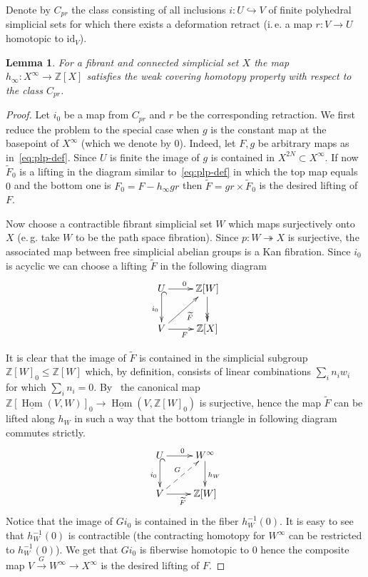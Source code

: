 \documentclass[oneside, 10pt]{amsart}
\theoremstyle{plain}
\numberwithin{equation}{section}
\newtheorem{lemma}{Lemma}
\numberwithin{lemma}{section}
\theoremstyle{remark}
\theoremstyle{definition}
\DeclareMathOperator{\Hom}{Hom}
\newcommand{\ZZ}{\mathbb{Z}}
\begin{document}
Denote by $C_{pr}$ the class consisting of all inclusions $i\colon U\hookrightarrow V$ of finite polyhedral simplicial sets 
 for which there exists a deformation retract (i.\,e. a map $r\colon V\to U$ homotopic to $\mathrm{id}_V$).
\begin{lemma} \label{lm:dhlp} For a fibrant and connected simplicial set $X$ the map $h_\infty \colon X^\infty \to \ZZ[X]$ satisfies the weak covering homotopy property with respect to the class $C_{pr}$.
\end{lemma}
\begin{proof}
 Let $i_0$ be a map from $C_{pr}$ and $r$ be the corresponding retraction.
 We first reduce the problem to the special case when $g$ is the constant map at the basepoint of $X^\infty$ (which we denote by $0$).
 Indeed, let $F, g$ be arbitrary maps as in~\eqref{eq:plp-def}.
 Since $U$ is finite the image of $g$ is contained in $X^{2N} \subset X^\infty$.
 If now $\widetilde{F}_0$ is a lifting in the diagram similar to~\eqref{eq:plp-def} in which the top map equals $0$ and the bottom one is $F_0 = F - h_\infty gr$
  then $\widetilde{F} = gr \times \widetilde{F}_0$ is the desired lifting of $F$.
  
 Now choose a contractible fibrant simplicial set $W$ which maps surjectively onto $X$ (e.\,g. take $W$ to be the path space fibration).
 Since $p \colon W \twoheadrightarrow X$ is surjective, the associated map between free simplicial abelian groups is a Kan fibration. %
 Since $i_0$ is acyclic we can choose a lifting $\widetilde{F}$ in the following diagram
\begin{equation} \nonumber \xymatrix{ 
U \ar[r]^{0}  \ar@{^{(}->}_{i_0}[d] & \ZZ[W] \ar@{->>}[d]  \\
V \ar[r]_{F} \ar[ru]_{\widetilde{F}} & \ZZ[X]}
\end{equation}

 It is clear that the image of $\widetilde{F}$ is contained in the simplicial subgroup $\ZZ[W]_0 \leq \ZZ[W]$ which, by definition, consists of linear combinations $\sum_i n_i w_i$ for which $\sum_i n_i = 0$.
 By~\cite[Lemma~9.1]{Po17} the canonical map $\ZZ[\underline{\Hom}(V, W)]_0 \to \underline{\Hom}(V, \ZZ[W]_0)$ is surjective, hence
  the map $\widetilde{F}$ can be lifted along $h_W$ in such a way that the bottom triangle in following diagram commutes strictly.
\begin{equation} \nonumber \label{eq:W-lift} \xymatrix{ 
U \ar[r]^{0}  \ar@{^{(}->}_{i_0}[d]                               & W^\infty \ar[d]^{h_W}  \\
V \ar[r]_{\widetilde{F}} \ar@{-->}[ru]^{G} & \ZZ[W]}
\end{equation}
 Notice that the image of $Gi_0$ is contained in the fiber $h_W^{-1}(0)$.
 It is easy to see that $h_W^{-1}(0)$ is contractible (the contracting homotopy for $W^\infty$ can be restricted to $h_W^{-1}(0)$).
 We get that $Gi_0$ is fiberwise homotopic to $0$ hence the composite map $V \xrightarrow{G} W^\infty \to X^\infty$ is the desired lifting of $F$. \end{proof}
\end{document}
